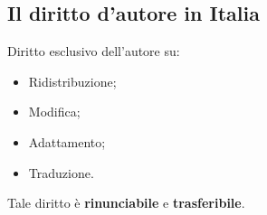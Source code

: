 \subsection{Il diritto d'autore in Italia}

Diritto esclusivo dell'autore su:

\begin{itemize}

\item Ridistribuzione;
\item Modifica;
\item Adattamento;
\item Traduzione.

\end{itemize}

Tale diritto è \textbf{rinunciabile} e \textbf{trasferibile}.
